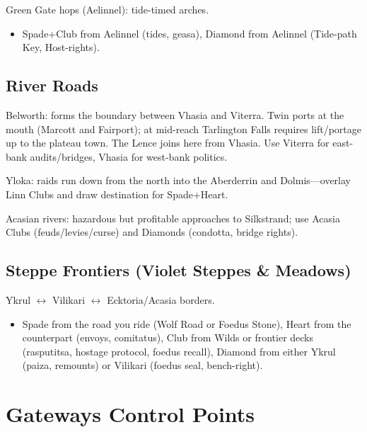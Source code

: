 Green Gate hops (Aelinnel): tide-timed arches.

\begin{itemize}
\item Spade+Club from Aelinnel (tides, geasa), Diamond from Aelinnel (Tide-path Key, Host-rights).
\end{itemize}

\subsection{River Roads}
Belworth: forms the boundary between Vhasia and Viterra. Twin ports at the mouth (Marcott and Fairport); at mid-reach Tarlington Falls requires lift/portage up to the plateau town. The Lence joins here from Vhasia. Use Viterra for east-bank audits/bridges, Vhasia for west-bank politics.

Yloka: raids run down from the north into the Aberderrin and Dolmis---overlay Linn Clubs and draw destination for Spade+Heart.

Acasian rivers: hazardous but profitable approaches to Silkstrand; use Acasia Clubs (feuds/levies/curse) and Diamonds (condotta, bridge rights).

\subsection{Steppe Frontiers (Violet Steppes \& Meadows)}
Ykrul $\leftrightarrow$ Vilikari $\leftrightarrow$ Ecktoria/Acasia borders.

\begin{itemize}
\item Spade from the road you ride (Wolf Road or Foedus Stone), Heart from the counterpart (envoys, comitatus), Club from Wilds or frontier decks (rasputitsa, hostage protocol, foedus recall), Diamond from either Ykrul (paiza, remounts) or Vilikari (foedus seal, bench-right).
\end{itemize}

\section{Gateways Control Points}

